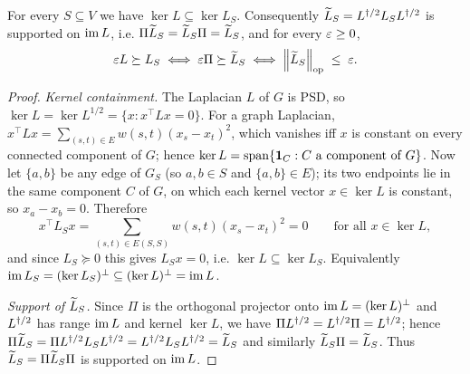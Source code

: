 \begin{qsixlemma}\label{lem:opnorm-form}
For every $S\subseteq V$ we have $\ker L\subseteq\ker L_S$. Consequently
$\widetilde{L}_S=L^{\dagger/2} L_SL^{\dagger/2}$ is supported on $\operatorname{im} L$, i.e.
$\Pi\widetilde{L}_S=\widetilde{L}_S\Pi=\widetilde{L}_S$, and for every $\varepsilon\ge 0$,
\begin{equation}\label{eq:opnorm-form}
  \varepsilon L\succeq L_S
  \;\Longleftrightarrow\;
  \varepsilon\Pi\succeq\widetilde{L}_S
  \;\Longleftrightarrow\;
  \left\lVert \widetilde{L}_S \right\rVert_{\mathrm{op}} \;\le\; \varepsilon.
\end{equation}
\end{qsixlemma}

\begin{proof}
\emph{Kernel containment.} The Laplacian $L$ of $G$ is PSD, so
$\ker L=\ker L^{1/2}=\{x:x^\top L x=0\}$. For a graph Laplacian,
$x^\top L x=\sum_{(s,t)\in E}w(s,t)(x_s-x_t)^2$, which vanishes iff $x$ is constant
on every connected component of $G$; hence $\ker L=\operatorname{span}\{\mathbf 1_C:C\text{ a
component of }G\}$. Now let $\{a,b\}$ be any edge of $G_S$ (so $a,b\in S$ and
$\{a,b\}\in E$); its two endpoints lie in the same component $C$ of $G$, on which
each kernel vector $x\in\ker L$ is constant, so $x_a-x_b=0$. Therefore
\[
  x^\top L_S x=\sum_{(s,t)\in E(S,S)}w(s,t)(x_s-x_t)^2=0
  \qquad\text{for all }x\in\ker L,
\]
and since $L_S\succeq 0$ this gives $L_S x=0$, i.e. $\ker L\subseteq\ker L_S$.
Equivalently $\operatorname{im} L_S=(\ker L_S)^\perp\subseteq(\ker L)^\perp=\operatorname{im} L$.

\emph{Support of $\widetilde{L}_S$.} Since $\Pi$ is the orthogonal projector onto
$\operatorname{im} L=(\ker L)^\perp$ and $L^{\dagger/2}$ has range $\operatorname{im} L$ and kernel $\ker L$,
we have $\Pi L^{\dagger/2}=L^{\dagger/2}\Pi=L^{\dagger/2}$; hence
$\Pi\widetilde{L}_S=\Pi L^{\dagger/2} L_SL^{\dagger/2}=L^{\dagger/2} L_SL^{\dagger/2}=\widetilde{L}_S$ and similarly
$\widetilde{L}_S\Pi=\widetilde{L}_S$. Thus $\widetilde{L}_S=\Pi\widetilde{L}_S\Pi$ is supported on
$\operatorname{im} L$.


\end{proof}

